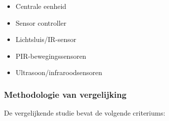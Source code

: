 \begin{itemize}
    \item Centrale eenheid
    \item Sensor controller
    \item Lichtsluis/IR-sensor
    \item PIR-bewegingssensoren
    \item Ultrasoon/infraroodsensoren
\end{itemize}


\subsubsection{Methodologie van vergelijking}

De vergelijkende studie bevat de volgende criteriums:

